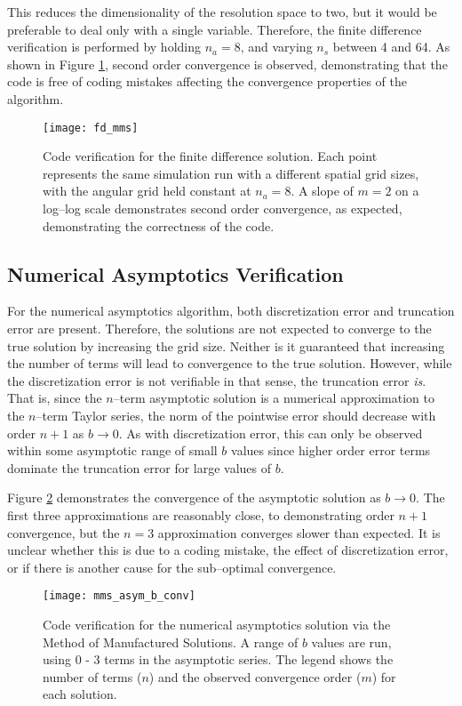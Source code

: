This reduces the dimensionality of the resolution space to two, but it would be preferable to deal only with a single variable.
Therefore, the finite difference verification is performed by holding $n_a=8$, and varying $n_s$ between 4 and 64.
As shown in Figure \ref{fig:fd_mms}, second order convergence is observed, demonstrating that the code is free of coding mistakes affecting the convergence properties of the algorithm.

\begin{figure}[h]
  \centering
  \texttt{[image: fd\_mms]}
  \caption{Code verification for the finite difference solution. Each point represents the same simulation run with a different spatial grid sizes, with the angular grid held constant at $n_a=8$. A slope of $m=2$ on a log--log scale demonstrates second order convergence, as expected, demonstrating the correctness of the code.}
  \label{fig:fd_mms}
\end{figure}

\subsection{Numerical Asymptotics Verification}
\label{sec:num_asym_mms}
For the numerical asymptotics algorithm, both discretization error and truncation error are present.
Therefore, the solutions are not expected to converge to the true solution by increasing the grid size.
Neither is it guaranteed that increasing the number of terms will lead to convergence to the true solution.
However, while the discretization error is not verifiable in that sense, the truncation error \textit{is}.
That is, since the $n$--term asymptotic solution is a numerical approximation to the $n$--term Taylor series, the norm of the pointwise error should decrease with order $n+1$ as $b \to 0$.
As with discretization error, this can only be observed within some asymptotic range of small $b$ values since higher order error terms dominate the truncation error for large values of $b$.

Figure \ref{fig:mms_asym_b_conv} demonstrates the convergence of the asymptotic solution as $b \to 0$.
The first three approximations are reasonably close, to demonstrating order $n+1$ convergence, but the $n=3$ approximation converges slower than expected.
It is unclear whether this is due to a coding mistake, the effect of discretization error, or if there is another cause for the sub--optimal convergence.
\begin{figure}[h]
  \centering
  \texttt{[image: mms\_asym\_b\_conv]}
  \caption{Code verification for the numerical asymptotics solution via the Method of Manufactured Solutions. A range of $b$ values are run, using 0 - 3 terms in the asymptotic series. The legend shows the number of terms ($n$) and the observed convergence order ($m$) for each solution.}
  \label{fig:mms_asym_b_conv}
\end{figure}

